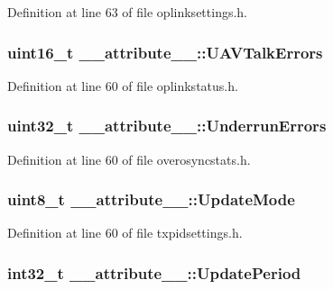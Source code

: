 \-Definition at line 63 of file oplinksettings.\-h.

\hypertarget{struct____attribute_____af14551146af4c6409242afa821832179}{
\subsubsection[{\-U\-A\-V\-Talk\-Errors}]{\setlength{\rightskip}{0pt plus 5cm}uint16\-\_\-t {\bf \-\_\-\-\_\-attribute\-\_\-\-\_\-\-::\-U\-A\-V\-Talk\-Errors}}}\label{struct____attribute_____af14551146af4c6409242afa821832179}


\-Definition at line 60 of file oplinkstatus.\-h.

\hypertarget{struct____attribute_____abed33ceef035bc071899ec27a54a8046}{
\subsubsection[{\-Underrun\-Errors}]{\setlength{\rightskip}{0pt plus 5cm}uint32\-\_\-t {\bf \-\_\-\-\_\-attribute\-\_\-\-\_\-\-::\-Underrun\-Errors}}}\label{struct____attribute_____abed33ceef035bc071899ec27a54a8046}


\-Definition at line 60 of file overosyncstats.\-h.

\hypertarget{struct____attribute_____a873aaefce940e97c425f0eb0822c8d85}{
\subsubsection[{\-Update\-Mode}]{\setlength{\rightskip}{0pt plus 5cm}uint8\-\_\-t {\bf \-\_\-\-\_\-attribute\-\_\-\-\_\-\-::\-Update\-Mode}}}\label{struct____attribute_____a873aaefce940e97c425f0eb0822c8d85}


\-Definition at line 60 of file txpidsettings.\-h.

\hypertarget{struct____attribute_____a155e7fc093cbb5aae13739e0fd103a01}{
\subsubsection[{\-Update\-Period}]{\setlength{\rightskip}{0pt plus 5cm}int32\-\_\-t {\bf \-\_\-\-\_\-attribute\-\_\-\-\_\-\-::\-Update\-Period}}}\label{struct____attribute_____a155e7fc093cbb5aae13739e0fd103a01}


